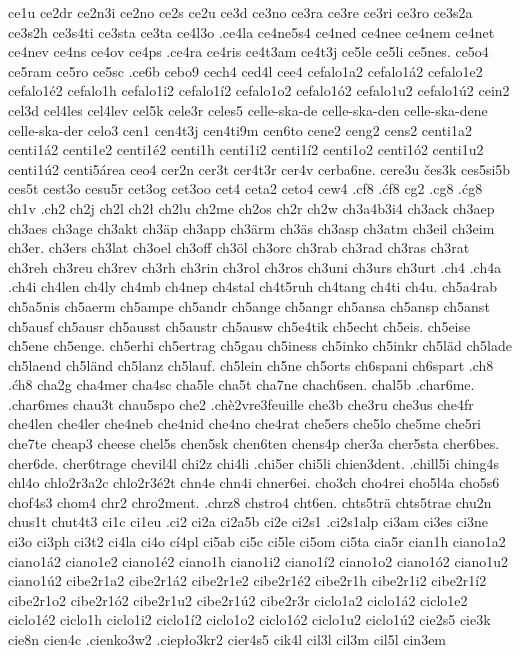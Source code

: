 ce1u
ce2dr
ce2n3i
ce2no
ce2s
ce2u
ce3d
ce3no
ce3ra
ce3re
ce3ri
ce3ro
ce3s2a
ce3s2h
ce3s4ti
ce3sta
ce3ta
ce4l3o
.ce4la
ce4ne5s4
ce4ned
ce4nee
ce4nem
ce4net
ce4nev
ce4ns
ce4ov
ce4ps
.ce4ra
ce4ris
ce4t3am
ce4t3j
ce5le
ce5li
ce5nes.
ce5o4
ce5ram
ce5ro
ce5sc
.ce6b
cebo9
cech4
ced4l
cee4
cefalo1a2
cefalo1á2
cefalo1e2
cefalo1é2
cefalo1h
cefalo1i2
cefalo1í2
cefalo1o2
cefalo1ó2
cefalo1u2
cefalo1ú2
cein2
cel3d
cel4les
cel4lev
cel5k
cele3r
celes5
celle-ska-de
celle-ska-den
celle-ska-dene
celle-ska-der
celo3
cen1
cen4t3j
cen4ti9m
cen6to
cene2
ceng2
cens2
centi1a2
centi1á2
centi1e2
centi1é2
centi1h
centi1i2
centi1í2
centi1o2
centi1ó2
centi1u2
centi1ú2
centi5área
ceo4
cer2n
cer3t
cer4t3r
cer4v
cerba6ne.
cere3u
čes3k
ces5si5b
ces5t
cest3o
cesu5r
cet3og
cet3oo
cet4
ceta2
ceto4
cew4
.cf8
.ćf8
cg2
.cg8
.ćg8
ch1v
.ch2
ch2j
ch2l
ch2ł
ch2lu
ch2me
ch2os
ch2r
ch2w
ch3a4b3i4
ch3ack
ch3aep
ch3aes
ch3age
ch3akt
ch3äp
ch3app
ch3ärm
ch3äs
ch3asp
ch3atm
ch3eil
ch3eim
ch3er.
ch3ers
ch3lat
ch3oel
ch3off
ch3öl
ch3orc
ch3rab
ch3rad
ch3ras
ch3rat
ch3reh
ch3reu
ch3rev
ch3rh
ch3rin
ch3rol
ch3ros
ch3uni
ch3urs
ch3urt
.ch4
.ch4a
.ch4i
ch4len
ch4ly
ch4mb
ch4nep
ch4stal
ch4t5ruh
ch4tang
ch4ti
ch4u.
ch5a4rab
ch5a5nis
ch5aerm
ch5ampe
ch5andr
ch5ange
ch5angr
ch5ansa
ch5ansp
ch5anst
ch5ausf
ch5ausr
ch5ausst
ch5austr
ch5ausw
ch5e4tik
ch5echt
ch5eis.
ch5eise
ch5ene
ch5enge.
ch5erhi
ch5ertrag
ch5gau
ch5iness
ch5inko
ch5inkr
ch5läd
ch5lade
ch5laend
ch5länd
ch5lanz
ch5lauf.
ch5lein
ch5ne
ch5orts
ch6spani
ch6spart
.ch8
.ćh8
cha2g
cha4mer
cha4sc
cha5le
cha5t
cha7ne
chach6sen.
chal5b
.char6me.
.char6mes
chau3t
chau5spo
che2
.chè2vre3feuille
che3b
che3ru
che3us
che4fr
che4len
che4ler
che4neb
che4nid
che4no
che4rat
che5ers
che5lo
che5me
che5ri
che7te
cheap3
cheese
chel5s
chen5sk
chen6ten
chens4p
cher3a
cher5sta
cher6bes.
cher6de.
cher6trage
chevil4l
chi2z
chi4li
.chi5er
chi5li
chien3dent.
.chill5i
ching4s
chl4o
chlo2r3a2c
chlo2r3é2t
chn4e
chn4i
chner6ei.
cho3ch
cho4rei
cho5l4a
cho5s6
chof4s3
chom4
chr2
chro2ment.
.chrz8
chstro4
cht6en.
chts5trä
chts5trae
chu2n
chus1t
chut4t3
ci1c
ci1eu
.ci2
ci2a
ci2a5b
ci2e
ci2s1
.ci2s1alp
ci3am
ci3es
ci3ne
ci3o
ci3ph
ci3t2
ci4la
ci4o
cí4pl
ci5ab
ci5c
ci5le
ci5om
ci5ta
cia5r
cian1h
ciano1a2
ciano1á2
ciano1e2
ciano1é2
ciano1h
ciano1i2
ciano1í2
ciano1o2
ciano1ó2
ciano1u2
ciano1ú2
cibe2r1a2
cibe2r1á2
cibe2r1e2
cibe2r1é2
cibe2r1h
cibe2r1i2
cibe2r1í2
cibe2r1o2
cibe2r1ó2
cibe2r1u2
cibe2r1ú2
cibe2r3r
ciclo1a2
ciclo1á2
ciclo1e2
ciclo1é2
ciclo1h
ciclo1i2
ciclo1í2
ciclo1o2
ciclo1ó2
ciclo1u2
ciclo1ú2
cie2s5
cie3k
cie8n
cien4c
.cienko3w2
.ciepło3kr2
cier4s5
cik4l
cil3l
cil3m
cil5l
cin3em
